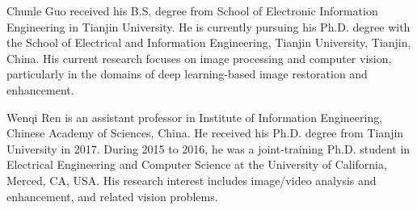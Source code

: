 \documentclass[journal]{IEEEtran}
\begin{document}
\begin{IEEEbiography}{Chunle Guo}
received his B.S. degree from School of Electronic Information Engineering in Tianjin University. He is currently pursuing his Ph.D. degree with the School of Electrical and Information Engineering, Tianjin University, Tianjin, China. His current research focuses on image processing and computer vision, particularly in the domains of deep learning-based image restoration and enhancement.
\end{IEEEbiography}


\begin{IEEEbiography}{Wenqi Ren}
is an assistant professor in Institute of Information Engineering, Chinese Academy of Sciences, China. He received his Ph.D. degree from Tianjin University in 2017. During 2015 to 2016, he was a joint-training Ph.D. student in Electrical Engineering and Computer Science at the University of California, Merced, CA, USA. His research interest includes image/video analysis and enhancement, and related vision problems.
\end{IEEEbiography}
\end{document}
